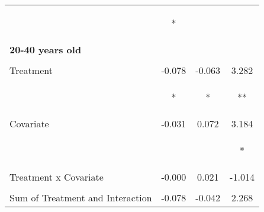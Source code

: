\begin{tabular}{lccc}
 & \begin{footnotesize}[0.041]*\end{footnotesize} & \begin{footnotesize}[0.033]\end{footnotesize} & \begin{footnotesize}[1.287]\end{footnotesize}\\
\noalign{\smallskip}\textbf{20-40 years old} &  &  & \\
 & \begin{footnotesize}\end{footnotesize} & \begin{footnotesize}\end{footnotesize} & \begin{footnotesize}\end{footnotesize}\\
\noalign{\smallskip}Treatment & -0.078 & -0.063 & 3.282\\
 & \begin{footnotesize}[0.041]*\end{footnotesize} & \begin{footnotesize}[0.036]*\end{footnotesize} & \begin{footnotesize}[1.341]**\end{footnotesize}\\
\noalign{\smallskip}Covariate & -0.031 & 0.072 & 3.184\\
 & \begin{footnotesize}[0.056]\end{footnotesize} & \begin{footnotesize}[0.044]\end{footnotesize} & \begin{footnotesize}[1.726]*\end{footnotesize}\\
\noalign{\smallskip}Treatment x Covariate & -0.000 & 0.021 & -1.014\\
 & \begin{footnotesize}[0.056]\end{footnotesize} & \begin{footnotesize}[0.048]\end{footnotesize} & \begin{footnotesize}[1.823]\end{footnotesize}\\
\noalign{\smallskip}Sum of Treatment and Interaction & -0.078 & -0.042 & 2.268\\

\end{tabular}
